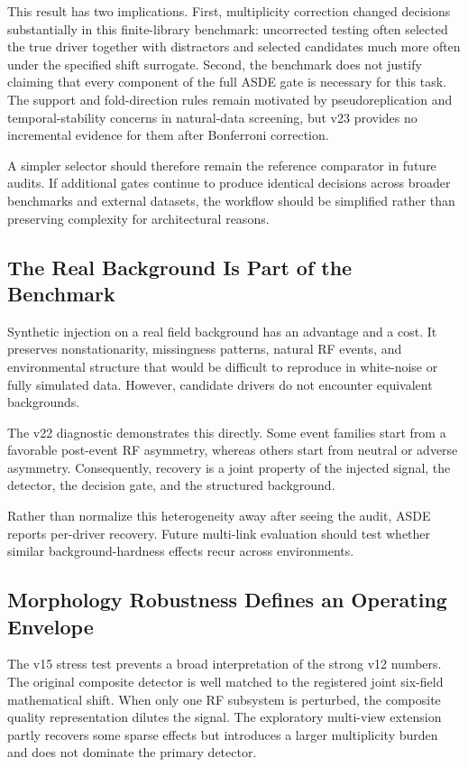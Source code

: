 \documentclass{ieeeaccess}
\begin{document}
This result has two implications. First, multiplicity correction changed decisions substantially in this finite-library benchmark: uncorrected testing often selected the true driver together with distractors and selected candidates much more often under the specified shift surrogate. Second, the benchmark does not justify claiming that every component of the full ASDE gate is necessary for this task. The support and fold-direction rules remain motivated by pseudoreplication and temporal-stability concerns in natural-data screening, but v23 provides no incremental evidence for them after Bonferroni correction.

A simpler selector should therefore remain the reference comparator in future audits. If additional gates continue to produce identical decisions across broader benchmarks and external datasets, the workflow should be simplified rather than preserving complexity for architectural reasons.

\subsection{The Real Background Is Part of the Benchmark}\label{the-real-background-is-part-of-the-benchmark}

Synthetic injection on a real field background has an advantage and a cost. It preserves nonstationarity, missingness patterns, natural RF events, and environmental structure that would be difficult to reproduce in white-noise or fully simulated data. However, candidate drivers do not encounter equivalent backgrounds.

The v22 diagnostic demonstrates this directly. Some event families start from a favorable post-event RF asymmetry, whereas others start from neutral or adverse asymmetry. Consequently, recovery is a joint property of the injected signal, the detector, the decision gate, and the structured background.

Rather than normalize this heterogeneity away after seeing the audit, ASDE reports per-driver recovery. Future multi-link evaluation should test whether similar background-hardness effects recur across environments.

\subsection{Morphology Robustness Defines an Operating Envelope}\label{morphology-robustness-defines-an-operating-envelope}

The v15 stress test prevents a broad interpretation of the strong v12 numbers. The original composite detector is well matched to the registered joint six-field mathematical shift. When only one RF subsystem is perturbed, the composite quality representation dilutes the signal. The exploratory multi-view extension partly recovers some sparse effects but introduces a larger multiplicity burden and does not dominate the primary detector.
\end{document}
